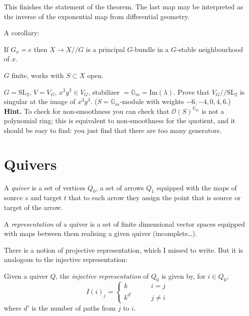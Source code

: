 This finishes the statement of the theorem. The last map may be interpreted as
the inverse of the exponential map from differential geometry.

A corollary:

\begin{lemma}
\label{lemma-}
If $G_x=e$ then $X \to X//G$ is a principal $G$-bundle in a $G$-stable
neighbourhood of $x$.
\end{lemma}

\begin{exercise}
\label{exercise-also-works-for-G-finite-and-S-open}
$G$ finite, works with $S\subset X$ open.
\end{exercise}

\begin{exercise}
\label{exercise-}
$G=\text{SL}_2$, $V=V_G$, $x^3y^3 \in V_G$, stabilizer
$=\mathbb{G}_m=\text{Im}(\lambda)$. Prove that $V_G//\text{SL}_2$ is singular at
the image of $x^3y^3$. ($S=\mathbb{G}_m$-module with weights $-6,-4,0,4,6$.)
{\bf Hint.} To
check for non-smoothness you can check that $\mathcal{O}(S)^{\mathbb{G}_m}$ is
not a polynomial ring; this is equivalent to non-smoothness for the quotient,
and it should be easy to find: you just find that there are too many generators.
\end{exercise}

\section{Quivers}
\label{section-quivers}

\begin{definition}
\label{definition-quiver}
A {\it quiver} is a set of vertices $Q_0$, a set of arrows $Q_1$ equipped with
the maps of source $s$ and target $t$ that to each arrow they assign the point
that is source or target of the arrow.
\end{definition}

\begin{definition}
\label{definition-representation-of-quiver}
A {\it representation} of a quiver is a set of finite dimensional vector spaces
equipped with maps between them realising a given quiver (incomplete…).
\end{definition}

There is a notion of projective representation, which I missed to write. But it
is analogous to the injective representation:

\begin{definition}
\label{definition-injective-representation-of-quivers}
Given a quiver $Q$, the {\it injective representation} of $Q_0$ is given by, for
$i \in Q_0$,
$$
I(i)_j=\begin{cases}
k\qquad &i=j \\
k^{d'}\qquad &j \neq i
\end{cases}
$$
where $d'$ is the number of paths from $j$ to $i$.
\end{definition}








